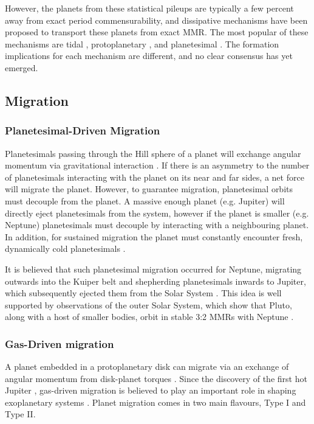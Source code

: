 \documentclass[12pt,letter]{aastex}
\begin{document}
However, the planets from these statistical pileups are typically a few percent away from exact period commensurability, and dissipative mechanisms have been proposed to transport these planets from exact MMR. 
The most popular of these mechanisms are tidal \citep{LithwickWu2012, Batygin2013, Delisle2014}, protoplanetary \citep{Rein2012b, Baruteau2013, Goldreich2014}, and planetesimal \citep{Moore2013, Chatterjee2015}. 
The formation implications for each mechanism are different, and no clear consensus has yet emerged.


\subsection{Migration}
\subsubsection{Planetesimal-Driven Migration}
Planetesimals passing through the Hill sphere of a planet will exchange angular momentum via gravitational interaction \citep{Ida2000, Kirsh2009}.
If there is an asymmetry to the number of planetesimals interacting with the planet on its near and far sides, a net force will migrate the planet. 
However, to guarantee migration, planetesimal orbits must decouple from the planet. 
A massive enough planet (e.g. Jupiter) will directly eject planetesimals from the system, however if the planet is smaller (e.g. Neptune) planetesimals must decouple by interacting with a neighbouring planet. 
In addition, for sustained migration the planet must constantly encounter fresh, dynamically cold planetesimals \citep{Armitage2010}.  

It is believed that such planetesimal migration occurred for Neptune, migrating outwards into the Kuiper belt and shepherding planetesimals inwards to Jupiter, which subsequently ejected them from the Solar System \citep{Fernandez1984}.
This idea is well supported by observations of the outer Solar System, which show that Pluto, along with a host of smaller bodies, orbit in stable 3:2 MMRs with Neptune \citep{Malhotra1993, Malhotra1995}.

\subsubsection{Gas-Driven migration}
A planet embedded in a protoplanetary disk can migrate via an exchange of angular momentum from disk-planet torques \citep{Goldreich1980}.
Since the discovery of the first hot Jupiter \citep{Mayor1995}, gas-driven migration is believed to play an important role in shaping exoplanetary systems \citep{Lin1996}.
Planet migration comes in two main flavours, Type I and Type II. 
\end{document}
